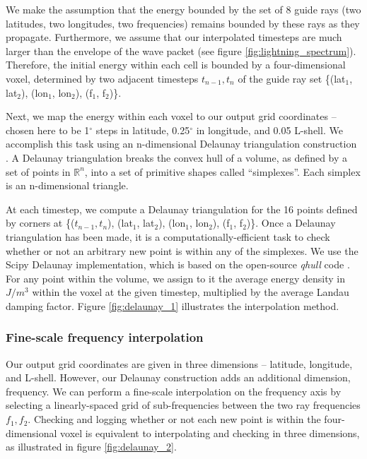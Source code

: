 We make the assumption that the energy bounded by the set of 8 guide rays (two latitudes, two longitudes, two frequencies) remains bounded by these rays as they propagate. Furthermore, we assume that our interpolated timesteps are much larger than the envelope of the wave packet (see figure \ref{fig:lightning_spectrum}). Therefore, the initial energy within each cell is bounded by a four-dimensional voxel, determined by two adjacent timesteps $t_{n-1}, t_n$ of the guide ray set \{(lat$_1$, lat$_2$), (lon$_1$, lon$_2$), (f$_1$, f$_2$)\}.

Next, we map the energy within each voxel to our output grid coordinates -- chosen here to be 1$^\circ$ steps in latitude, 0.25$^\circ$ in longitude, and 0.05 L-shell. We accomplish this task using an n-dimensional Delaunay triangulation construction \citep{Delaunay1934, Lee1980}. A Delaunay triangulation breaks the convex hull of a volume, as defined by a set of points in $\mathbb R^n$, into a set of primitive shapes called ``simplexes''. Each simplex is an n-dimensional triangle. 

At each timestep, we compute a Delaunay triangulation for the 16 points defined by corners at \{($t_{n-1}, t_n$), (lat$_1$, lat$_2$), (lon$_1$, lon$_2$), (f$_1$, f$_2$)\}. Once a Delaunay triangulation has been made, it is a computationally-efficient task to check whether or not an arbitrary new point is within any of the simplexes. We use the Scipy Delaunay implementation, which is based on the open-source \emph{qhull} code \citep{Barber1996}. For any point within the volume, we assign to it the average energy density in $J/m^3$ within the voxel at the given timestep, multiplied by the average Landau damping factor. Figure \ref{fig:delaunay_1} illustrates the interpolation method.

\subsubsection{Fine-scale frequency interpolation}
Our output grid coordinates are given in three dimensions -- latitude, longitude, and L-shell. However, our Delaunay construction adds an additional dimension, frequency. We can perform a fine-scale interpolation on the frequency axis by selecting a linearly-spaced grid of sub-frequencies between the two ray frequencies $f_1, f_2$. Checking and logging whether or not each new point is within the four-dimensional voxel is equivalent to interpolating and checking in three dimensions, as illustrated in figure \ref{fig:delaunay_2}.

